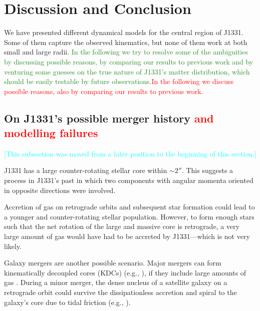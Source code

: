 \documentclass[useAMS,usenatbib]{mnras}
\newcommand{\NOTE}[1]{\textcolor{Cyan}{#1}}
\newcommand{\NEW}[1]{\textcolor{ForestGreen}{#1}}
\newcommand{\OLD}[1]{\textcolor{Red}{#1}}
\begin{document}
\section{Discussion and Conclusion} \label{sec:Discussion}

We have presented different dynamical models for the central region of J1331. Some of them capture the observed kinematics, but none of them work at both small and large radii. \NEW{In the following we try to resolve some of the ambiguities by discussing possible reasons, by comparing our results to previous work and by venturing some guesses on the true nature of J1331's matter distribution, which should be easily testable by future observations.}\OLD{In the following we discuss possible reasons, also by comparing our results to previous work.}

\subsection{On J1331's possible merger history\OLD{ and modelling failures}} \label{sec:discussion_merger}
\NOTE{[This subsection was moved from a later position to the beginning of this section.]}

J1331 has a large counter-rotating stellar core within $\sim 2''$. This suggests a process in J1331's past in which two components with angular momenta oriented in opposite directions were involved.

Accretion of gas on retrograde orbits and subsequent star formation could lead to a younger and counter-rotating stellar population. However, to form enough stars such that the net rotation of the large and massive core is retrograde, a very large amount of gas would have had to be accreted by J1331---which is not very likely. 

Galaxy mergers are another possible scenario. Major mergers can form kinematically decoupled cores (KDCs) (e.g., \citealt{2011MNRAS.414.2923K,2015ApJ...802L...3T}), if they include large amounts of gas \citep{2010ApJ...723..818H}. During a minor merger, the dense nucleus of a satellite galaxy on a retrograde orbit could survive the dissipationless accretion and spiral to the galaxy's core due to tidal friction (e.g., \citealt{1984ApJ...287..577K,1988ApJ...327L..55F}). 
\end{document}
